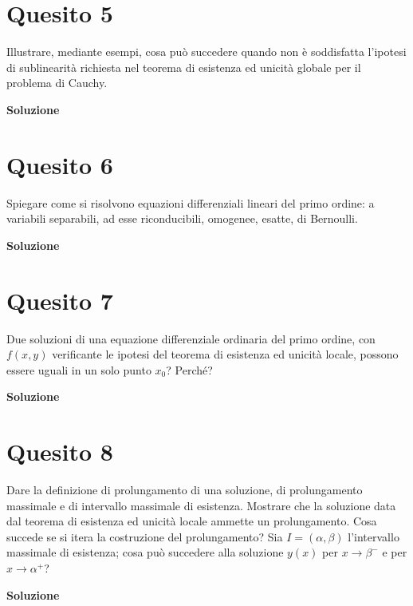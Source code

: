 \section*{Quesito 5}
Illustrare, mediante esempi, cosa può succedere quando non è soddisfatta
l'ipotesi di sublinearità richiesta nel teorema di esistenza ed unicità globale per il problema
di Cauchy.


\medskip
\begin{large}
\textbf{Soluzione}
\end{large}


\section*{Quesito 6}
Spiegare come si risolvono equazioni differenziali lineari del primo ordine: a
variabili separabili, ad esse riconducibili, omogenee, esatte, di Bernoulli.

\medskip
\begin{large}
\textbf{Soluzione}
\end{large}


\section*{Quesito 7}
Due soluzioni di una equazione differenziale ordinaria del primo ordine, con
$f(x, y)$ verificante le ipotesi del teorema di esistenza ed unicità locale, possono essere
uguali in un solo punto $x_0$? Perché?


\medskip
\begin{large}
\textbf{Soluzione}
\end{large}


\section*{Quesito 8}
Dare la definizione di prolungamento di una soluzione, di prolungamento
massimale e di intervallo massimale di esistenza. Mostrare che la soluzione data dal
teorema di esistenza ed unicità locale ammette un prolungamento. Cosa succede se si
itera la costruzione del prolungamento? Sia $I = (\alpha, \beta)$ l'intervallo massimale di esistenza;
cosa può succedere alla soluzione $y(x)$ per $x \to \beta^-$ e per $x \to \alpha^+$?

\medskip
\begin{large}
\textbf{Soluzione}
\end{large}


